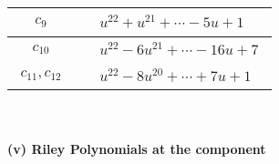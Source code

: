 \documentclass[1p]{elsarticle_modified}
\theoremstyle{definition}
\begin{document}
\begin{tabular}{m{50pt}|m{274pt}}
\hline $$\begin{aligned}c_{9}\end{aligned}$$&$\begin{aligned}
&u^{22}+u^{21}+\cdots-5 u+1
\end{aligned}$\\
\hline $$\begin{aligned}c_{10}\end{aligned}$$&$\begin{aligned}
&u^{22}-6 u^{21}+\cdots-16 u+7
\end{aligned}$\\
\hline $$\begin{aligned}c_{11},c_{12}\end{aligned}$$&$\begin{aligned}
&u^{22}-8 u^{20}+\cdots+7 u+1
\end{aligned}$\\
\hline
\end{tabular}\\~\\
\newpage\renewcommand{\arraystretch}{1}
\flushleft \textbf{(v) Riley Polynomials at the component}\newline \\
\end{document}

